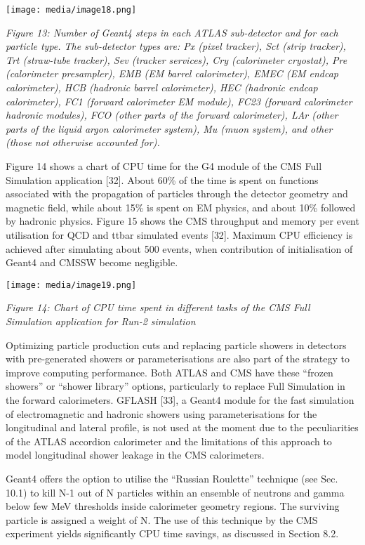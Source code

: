 \documentclass[12pt,a4paper]{article}
\begin{document}
\texttt{[image: media/image18.png]}

\emph{Figure 13: Number of Geant4 steps in each ATLAS sub-detector and
for each particle type. The sub-detector types are: Px (pixel tracker),
Sct (strip tracker), Trt (straw-tube tracker), Sev (tracker services),
Cry (calorimeter cryostat), Pre (calorimeter presampler), EMB (EM barrel
calorimeter), EMEC (EM endcap calorimeter), HCB (hadronic barrel
calorimeter), HEC (hadronic endcap calorimeter), FC1 (forward
calorimeter EM module), FC23 (forward calorimeter hadronic modules), FCO
(other parts of the forward calorimeter), LAr (other parts of the liquid
argon calorimeter system), Mu (muon system), and other (those not
otherwise accounted for).}

Figure 14 shows a chart of CPU time for the G4 module of the CMS Full
Simulation application {[}32{]}. About 60\% of the time is spent on
functions associated with the propagation of particles through the
detector geometry and magnetic field, while about 15\% is spent on EM
physics, and about 10\% followed by hadronic physics. Figure 15 shows
the CMS throughput and memory per event utilisation for QCD and ttbar
simulated events {[}32{]}. Maximum CPU efficiency is achieved after
simulating about 500 events, when contribution of initialisation of
Geant4 and CMSSW become negligible.

\texttt{[image: media/image19.png]}

\emph{Figure 14: Chart of CPU time spent in different tasks of the CMS
Full Simulation application for Run-2 simulation}

Optimizing particle production cuts and replacing particle showers in
detectors with pre-generated showers or parameterisations are also part
of the strategy to improve computing performance. Both ATLAS and CMS
have these ``frozen showers'' or ``shower library'' options,
particularly to replace Full Simulation in the forward calorimeters.
GFLASH {[}33{]}, a Geant4 module for the fast simulation of
electromagnetic and hadronic showers using parameterisations for the
longitudinal and lateral profile, is not used at the moment due to the
peculiarities of the ATLAS accordion calorimeter and the limitations of
this approach to model longitudinal shower leakage in the CMS
calorimeters.

Geant4 offers the option to utilise the ``Russian Roulette'' technique
(see Sec. 10.1) to kill N-1 out of N particles within an ensemble of
neutrons and gamma below few MeV thresholds inside calorimeter geometry
regions. The surviving particle is assigned a weight of N. The use of
this technique by the CMS experiment yields significantly CPU time
savings, as discussed in Section 8.2.
\end{document}
